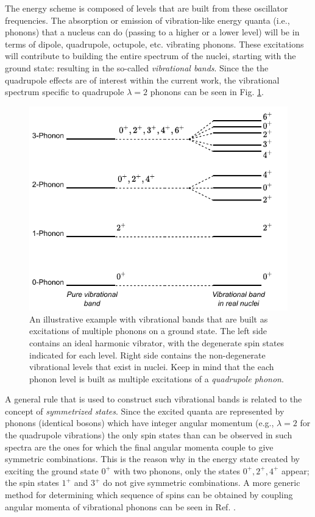 The energy scheme is composed of levels that are built from these oscillator frequencies. The absorption or emission of vibration-like energy quanta (i.e., phonons) that a nucleus can do (passing to a higher or a lower level) will be in terms of dipole, quadrupole, octupole, etc. vibrating phonons. These excitations will contribute to building the entire spectrum of the nuclei, starting with the ground state: resulting in the so-called \emph{vibrational bands}.
Since the the quadrupole effects are of interest within the current work, the vibrational spectrum specific to quadrupole $\lambda=2$ phonons can be seen in Fig. \ref{fig-vibrational-bands}.
\begin{figure}
    \centering
    \includegraphics[scale=1.1]{Chapters/Figures/vibrational_states.pdf}
    \caption{An illustrative example with vibrational bands that are built as excitations of multiple phonons on a ground state. The left side contains an ideal harmonic vibrator, with the degenerate spin states indicated for each level. Right side contains the non-degenerate vibrational levels that exist in nuclei. Keep in mind that the each phonon level is built as multiple excitations of a \emph{quadrupole phonon}.}
    \label{fig-vibrational-bands}
\end{figure}

A general rule that is used to construct such vibrational bands is related to the concept of \emph{symmetrized states}. Since the excited quanta are represented by phonons (identical bosons) which have integer angular momentum (e.g., $\lambda=2$ for the quadrupole vibrations) the only spin states than can be observed in such spectra are the ones for which the final angular momenta couple to give symmetric combinations. This is the reason why in the energy state created by exciting the ground state $0^+$ with two phonons, only the states $0^+,2^+,4^+$ appear; the spin states $1^+$ and $3^+$ do not give symmetric combinations. A more generic method for determining which sequence of spins can be obtained by coupling angular momenta of vibrational phonons can be seen in Ref. \cite{ring2004nuclear}.


